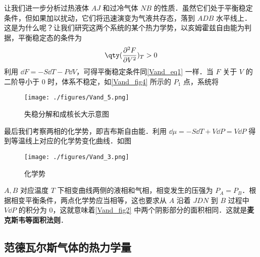 让我们进一步分析过热液体 $AJ$ 和过冷气体 $NB$ 的性质．虽然它们处于平衡稳定条件，但如果加以扰动，它们将迅速演变为气液共存态，落到 $ADB$ 水平线上．这是为什么呢？让我们研究这两个系统的某个热力学势，以亥姆霍兹自由能为判据，平衡稳定态的条件为
\begin{equation}
\qty(\frac{\partial^2 F}{\partial V^2})_T>0
\end{equation}
利用 $\dd F=-S\dd T-P\dd V$，可得平衡稳定条件同\autoref{Vand_eq1} 一样．当 $F$ 关于 $V$ 的二阶导小于 $0$ 时，体系不稳定，如\autoref{Vand_fig4} 所示的 $P_1$ 点，系统将

\begin{figure}[ht]
\centering
\texttt{[image: ./figures/Vand\_5.png]}
\caption{失稳分解和成核长大示意图} \label{Vand_fig4}
\end{figure}



最后我们考察两相的化学势，即吉布斯自由能．利用 $\dd \mu=-S\dd T+V\dd P=V\dd P$ 得到等温线上对应的化学势变化曲线．如图

\begin{figure}[ht]
\centering
\texttt{[image: ./figures/Vand\_3.png]}
\caption{化学势} \label{Vand_fig3}
\end{figure}
$A,B$ 对应温度 $T$ 下相变曲线两侧的液相和气相，相变发生的压强为 $P_A=P_B$．根据相变平衡条件，两点化学势应当相等，这也要求从 $A$ 沿着 $JDN$ 到 $B$ 过程中 $V\dd P$ 的积分为 $0$，这就意味着\autoref{Vand_fig2} 中两个阴影部分的面积相同．这就是\textbf{麦克斯韦等面积法则}．


\subsection{范德瓦尔斯气体的热力学量}
